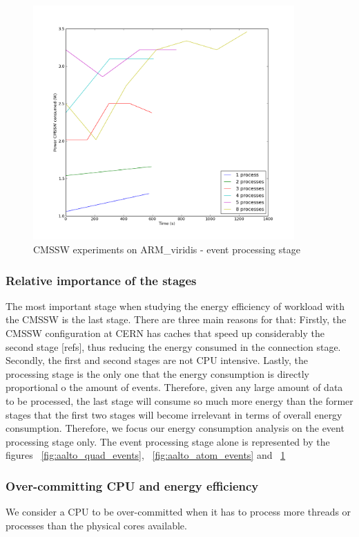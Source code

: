 \begin{figure}[h]
  \centering
    \includegraphics[width=100mm]{"img/aalto/aalto_armEvents"}
    \caption{CMSSW experiments on ARM\_viridis - event processing stage}
    \label{fig:aalto_arm_events}
\end{figure}

\subsubsection*{Relative importance of the stages}
The most important stage when studying the energy efficiency of
workload with the CMSSW is the last stage. There are three main reasons for that: Firstly, the CMSSW configuration at CERN has caches that speed up considerably the second stage [refs], thus reducing the energy consumed in the connection stage.
Secondly, the first and second stages are not CPU intensive.
Lastly, the processing stage is the only one that the energy consumption is directly proportional o the amount of events. Therefore, given any large amount of
data to be processed, the last stage will consume so much more energy than the former stages that the first two stages will become irrelevant in terms of overall energy consumption. Therefore, we focus our energy consumption analysis on the event processing stage only. The event processing stage alone is represented by the figures ~\ref{fig:aalto_quad_events}, ~\ref{fig:aalto_atom_events} and ~\ref{fig:aalto_arm_events}


\subsubsection*{Over-committing CPU and energy efficiency}
We consider a CPU to be over-committed when it has to process more threads or processes than the physical cores available.

